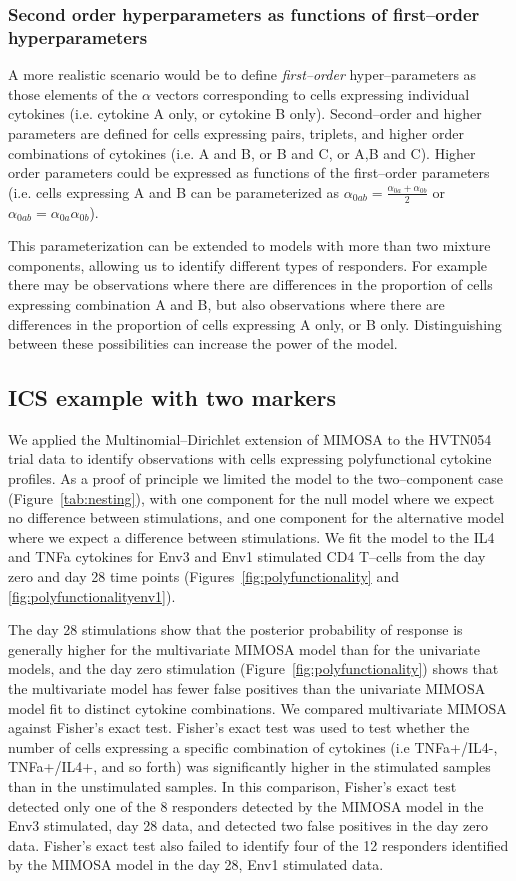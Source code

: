 \documentclass[11pt]{article}
\begin{document}
\subsubsection*{Second order hyperparameters as functions of first--order hyperparameters}
A more realistic scenario would be to define \textit{first--order} hyper--parameters as those elements of the $\alpha$ vectors corresponding to cells expressing individual cytokines (i.e. cytokine A only, or cytokine B only). Second--order and higher parameters are defined for cells expressing pairs, triplets, and higher order combinations of cytokines (i.e. A and B, or B and C, or A,B and C). Higher order parameters could be expressed as functions of the first--order parameters (i.e. cells expressing A and B can be parameterized as $\alpha_{0ab} = \frac{\alpha_{0a}+\alpha_{0b}}{2}$ or $\alpha_{0ab}=\alpha_{0a}\alpha_{0b}$). 

This parameterization can be extended to models with more than two mixture components, allowing us to identify different types of responders. For example there may be observations where there are differences in the proportion of cells expressing combination A and B, but also observations where there are differences in the proportion of cells expressing A only, or B only. Distinguishing between these possibilities can increase the power of the model.

\subsection{ICS example with two markers}
We applied the Multinomial--Dirichlet extension of MIMOSA to the HVTN054 trial data to identify observations with cells expressing polyfunctional cytokine profiles. As a proof of principle we limited the model to the two--component case (Figure~\ref{tab:nesting}), with one component for the null model where we expect no difference between stimulations, and one component for the alternative model where we expect a difference between stimulations. We fit the model to the IL4 and TNFa cytokines for Env3 and Env1 stimulated CD4 T--cells from the day zero and day 28 time points (Figures~\ref{fig:polyfunctionality} and \ref{fig:polyfunctionalityenv1}). 

The day 28 stimulations show that the posterior probability of response is generally higher for the multivariate MIMOSA model than for the univariate models, and the day zero stimulation (Figure~\ref{fig:polyfunctionality}) shows that the multivariate model has fewer false positives than the univariate MIMOSA model fit to distinct cytokine combinations. We compared multivariate MIMOSA against Fisher's exact test. Fisher's exact test was used to test whether the number of cells expressing a specific combination of cytokines (i.e TNFa+/IL4-, TNFa+/IL4+, and so forth) was significantly higher in the stimulated samples than in the unstimulated samples.  In this comparison, Fisher's exact test detected only one of the 8 responders detected by the MIMOSA model in the Env3 stimulated, day 28 data, and detected two false positives in the day zero data. Fisher's exact test also failed to identify four of the 12 responders identified by the MIMOSA model in the day 28, Env1 stimulated data.
\end{document}
